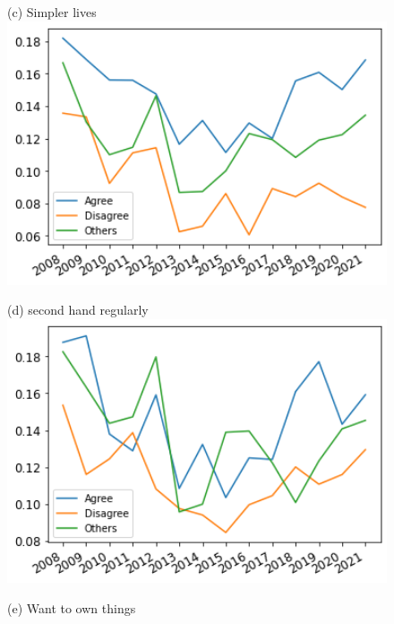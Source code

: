 \documentclass[12pt]{article}
\begin{document}
\begin{figure}[h!!]
\begin{minipage}[h!!]{0.32\textwidth}
		\centering\footnotesize{(c) Simpler lives}
		\includegraphics[width=1\textwidth]{../codding_data/results/liss/broad_groups_work_redcuctionqk20a181_actual.png}
	\end{minipage}
	\begin{minipage}[h!!]{0.32\textwidth}  
		\centering\footnotesize{(d) second hand regularly}
		\includegraphics[width=1\textwidth]{../codding_data/results/liss/broad_groups_work_redcuctionqk20a135_actual.png}
	\end{minipage}
	\begin{minipage}[h!!]{0.32\textwidth}  
		\centering\footnotesize{(e) Want to own things}

\end{minipage}
\end{figure}
\end{document}
